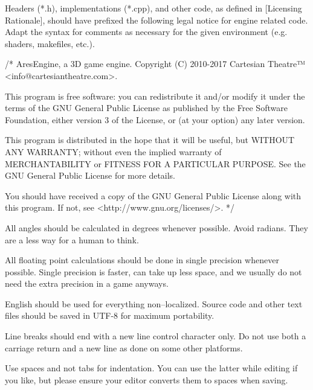 Headers (*.h), implementations (*.cpp), and other code, as defined in [Licensing Rationale], should have prefixed the following legal notice for engine related code. Adapt the syntax for comments as necessary for the given environment (e.g. shaders, makefiles, etc.).

\startCodeExample
/*
    AresEngine, a 3D game engine.
    Copyright (C) 2010-2017 Cartesian Theatre™ <info@cartesiantheatre.com>.

    This program is free software: you can redistribute it and/or modify
    it under the terms of the GNU General Public License as published by
    the Free Software Foundation, either version 3 of the License, or
    (at your option) any later version.

    This program is distributed in the hope that it will be useful,
    but WITHOUT ANY WARRANTY; without even the implied warranty of
    MERCHANTABILITY or FITNESS FOR A PARTICULAR PURPOSE. See the GNU
    General Public License for more details.

    You should have received a copy of the GNU General Public License
    along with this program. If not, see <http://www.gnu.org/licenses/>.
*/
\stopCodeExample


\startitemize[4]
\item
All angles should be calculated in degrees whenever possible. Avoid radians. They are a less  way for a human to think.

\item
All floating point calculations should be done in single precision whenever possible. Single precision is faster, can take up less space, and we usually do not need the extra precision in a game anyways.
\stopitemize


\startitemize[4]
\item
English should be used for everything non--localized. Source code and other text files should be saved in UTF-8 for maximum portability.

\item
Line breaks should end with a new line control character only. Do not use both a carriage return and a new line as done on some other platforms.

\item
Use spaces and not tabs for indentation. You can use the latter while editing if you like, but please ensure your editor converts them to spaces when saving.

